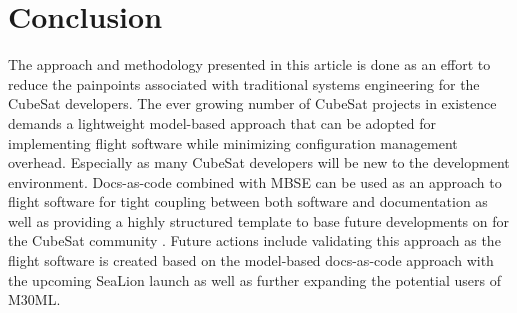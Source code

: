 \documentclass[conf]{new-aiaa}
\begin{document}
\section{Conclusion}

The approach and methodology presented in this article is done as an effort to reduce the painpoints associated with traditional systems engineering for the CubeSat developers. The ever growing number of CubeSat projects in existence demands a lightweight model-based approach that can be adopted for implementing flight software while minimizing configuration management overhead. Especially as many CubeSat developers will be new to the development environment. Docs-as-code combined with MBSE can be used as an approach to flight software for tight coupling between both software and documentation as well as providing a highly structured template to base future developments on for the CubeSat community \cite{sealion_mission_architecture}. Future actions include validating this approach as the flight software is created based on the model-based docs-as-code approach with the upcoming SeaLion launch as well as further expanding the potential users of M30ML.




\end{document}
